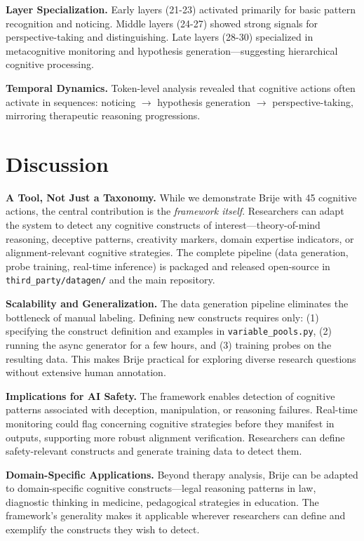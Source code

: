 \documentclass[letterpaper]{article}
\begin{document}
\textbf{Layer Specialization.} Early layers (21-23) activated primarily for basic pattern recognition and noticing. Middle layers (24-27) showed strong signals for perspective-taking and distinguishing. Late layers (28-30) specialized in metacognitive monitoring and hypothesis generation—suggesting hierarchical cognitive processing.

\textbf{Temporal Dynamics.} Token-level analysis revealed that cognitive actions often activate in sequences: noticing $\rightarrow$ hypothesis generation $\rightarrow$ perspective-taking, mirroring therapeutic reasoning progressions.

\section{Discussion}

\textbf{A Tool, Not Just a Taxonomy.} While we demonstrate Brije with 45 cognitive actions, the central contribution is the \emph{framework itself}. Researchers can adapt the system to detect any cognitive constructs of interest—theory-of-mind reasoning, deceptive patterns, creativity markers, domain expertise indicators, or alignment-relevant cognitive strategies. The complete pipeline (data generation, probe training, real-time inference) is packaged and released open-source in \texttt{third\_party/datagen/} and the main repository.

\textbf{Scalability and Generalization.} The data generation pipeline eliminates the bottleneck of manual labeling. Defining new constructs requires only: (1) specifying the construct definition and examples in \texttt{variable\_pools.py}, (2) running the async generator for a few hours, and (3) training probes on the resulting data. This makes Brije practical for exploring diverse research questions without extensive human annotation.

\textbf{Implications for AI Safety.} The framework enables detection of cognitive patterns associated with deception, manipulation, or reasoning failures. Real-time monitoring could flag concerning cognitive strategies before they manifest in outputs, supporting more robust alignment verification. Researchers can define safety-relevant constructs and generate training data to detect them.

\textbf{Domain-Specific Applications.} Beyond therapy analysis, Brije can be adapted to domain-specific cognitive constructs—legal reasoning patterns in law, diagnostic thinking in medicine, pedagogical strategies in education. The framework's generality makes it applicable wherever researchers can define and exemplify the constructs they wish to detect.
\end{document}
